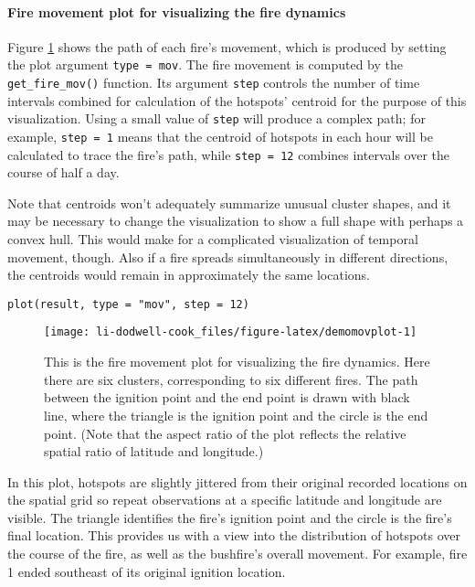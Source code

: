 \hypertarget{fire-movement-plot-for-visualizing-the-fire-dynamics}{%
\paragraph{Fire movement plot for visualizing the fire dynamics}\label{fire-movement-plot-for-visualizing-the-fire-dynamics}}

Figure \ref{fig:demomovplot} shows the path of each fire's movement, which is produced by setting the plot argument \texttt{type\ =\ \textquotesingle{}mov\textquotesingle{}}. The fire movement is computed by the \texttt{get\_fire\_mov()} function. Its argument \texttt{step} controls the number of time intervals combined for calculation of the hotspots' centroid for the purpose of this visualization. Using a small value of \texttt{step} will produce a complex path; for example, \texttt{step\ =\ 1} means that the centroid of hotspots in each hour will be calculated to trace the fire's path, while \texttt{step\ =\ 12} combines intervals over the course of half a day.

Note that centroids won't adequately summarize unusual cluster shapes, and it may be necessary to change the visualization to show a full shape with perhaps a convex hull. This would make for a complicated visualization of temporal movement, though. Also if a fire spreads simultaneously in different directions, the centroids would remain in approximately the same locations.

\begin{verbatim}
plot(result, type = "mov", step = 12)
\end{verbatim}

\begin{figure}

{\centering \texttt{[image: li-dodwell-cook\_files/figure-latex/demomovplot-1]} 

}

\caption{This is the fire movement plot for visualizing the fire dynamics. Here there are six clusters, corresponding to six different fires. The path between the ignition point and the end point is drawn with black line, where the triangle is the ignition point and the circle is the end point. (Note that the aspect ratio of the plot reflects the relative spatial ratio of latitude and longitude.)}\label{fig:demomovplot}
\end{figure}

In this plot, hotspots are slightly jittered from their original recorded locations on the spatial grid so repeat observations at a specific latitude and longitude are visible. The triangle identifies the fire's ignition point and the circle is the fire's final location. This provides us with a view into the distribution of hotspots over the course of the fire, as well as the bushfire's overall movement. For example, fire 1 ended southeast of its original ignition location.

